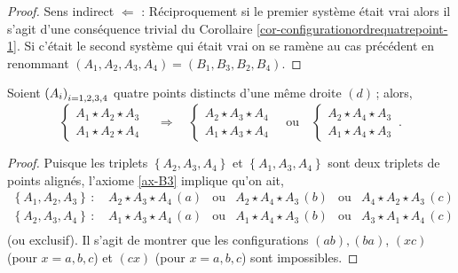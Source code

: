 \begin{cor}
\begin{proof}
        {Sens indirect $\Leftarrow$ : }Réciproquement si le premier système était vrai alors il s'agit d'une conséquence trivial du Corollaire \ref{cor-configurationordrequatrepoint-1}. Si c'était le second système qui était vrai on se ramène au cas précédent en renommant $(A_1,A_2,A_3,A_4)=(B_1,B_3,B_2,B_4)$.
    \end{proof}
\end{cor}
\begin{cor}\label{cor-configurationuncote}
    Soient $\left(A_{i}\right)_{i = 1,2,3,4}$ quatre points distincts d'une même droite $(d)$\,; alors,
    \begin{equation*}
        \left\{
        \begin{array}{cc}
             A_1 \star A_2 \star A_3  \\
             A_1 \star A_2 \star A_4 
        \end{array}
        \right. \quad \Longrightarrow \quad       
        \left\{\begin{array}{cc}
             A_2 \star A_3 \star A_4  \\
             A_1 \star A_3 \star A_4 
        \end{array}\right. \quad \text{ou} \quad
        \left\{\begin{array}{cc}
             A_2 \star A_4 \star A_3  \\
             A_1 \star A_4 \star A_3 
        \end{array}\right.\,.
    \end{equation*}
    \begin{proof}
        Puisque les triplets $\left\{A_2,A_3,A_4\right\}$ et $\left\{A_1,A_3,A_4\right\}$ sont deux triplets de points alignés, l'axiome \ref{ax-B3} implique qu'on ait,
        \begin{equation*}
            \begin{array}{cccccc}
                 \left\{A_1,A_2,A_3\right\}\,:\,& A_2 \star A_3 \star A_4 \,(a) & \text{ou} & A_2 \star A_4 \star A_3 \,(b) & \text{ou} & A_4 \star A_2 \star A_3 \,(c) \\
                 \left\{A_2,A_3,A_4\right\}\,:\,& A_1 \star A_3 \star A_4 \,(a) & \text{ou} & A_1 \star A_4 \star A_3 \,(b) & \text{ou} & A_3 \star A_1 \star A_4 \,(c) \\
            \end{array}
        \end{equation*}
        (ou exclusif). Il s'agit de montrer que les configurations $(ab),(ba)$, $(xc)$ (pour $x=a,b,c$) et $(cx)$ (pour $x=a,b,c$) sont impossibles.


\end{proof}
\end{cor}
